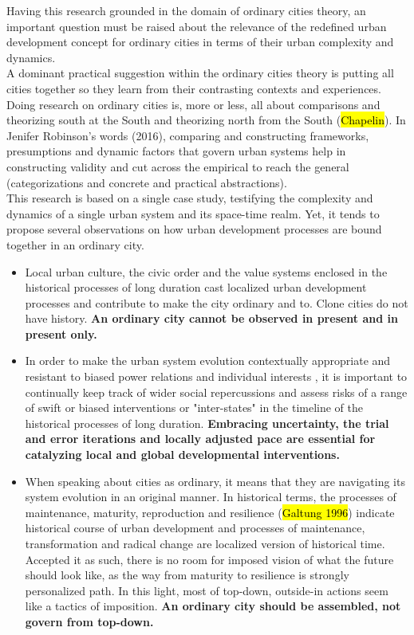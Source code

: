 \documentclass[11pt]{report}
\begin{document}
Having this research grounded in the domain of ordinary cities theory, an important question must be raised about the relevance of the redefined urban development concept for ordinary cities in terms of their urban complexity and dynamics.
\\
A dominant practical suggestion within the ordinary cities theory is putting all cities together so they learn from their contrasting contexts and experiences. Doing research on ordinary cities is, more or less, all about comparisons and theorizing south at the South   and theorizing north from the South (\hl{Chapelin}).
In Jenifer Robinson's words (2016), comparing and constructing frameworks, presumptions and dynamic factors that govern urban systems help in constructing validity and cut across the empirical to reach the general (categorizations and concrete and practical abstractions).
\\
This research is based on a single case study, testifying the complexity and dynamics of a single urban system and its space-time realm.
Yet, it tends to propose several observations on how urban development processes are bound together in an ordinary city.

\begin{itemize}
\item
Local urban culture, the civic order and the value systems enclosed in the historical processes of long duration cast localized urban development processes and contribute to make the city ordinary and to.
Clone cities do not have history.
\textbf{An ordinary city cannot be observed in present and in present only.}

\item 
In order to make the urban system evolution contextually appropriate  and resistant to biased power relations and individual interests , it is important to continually keep track of wider social repercussions and assess risks of a range of swift or biased interventions or
"inter-states" in the timeline of the historical processes of long duration.
\textbf{Embracing uncertainty, the trial and error iterations and locally adjusted pace are essential for catalyzing local and global developmental interventions.}

\item
When speaking about cities as ordinary, it means that they are navigating its system evolution in an original manner.
In historical terms, the processes of maintenance, maturity, reproduction and resilience (\hl{Galtung 1996}) indicate historical course of urban development and processes of maintenance, transformation and radical change  are localized version of historical time.
Accepted it as such, there is no room for imposed vision of what the future should look like, as the way from maturity to resilience is strongly personalized path. 
In this light, most of top-down, outside-in actions seem like a tactics of imposition. \textbf{An ordinary city should be assembled, not govern from top-down.}

\end{itemize}
\end{document}
